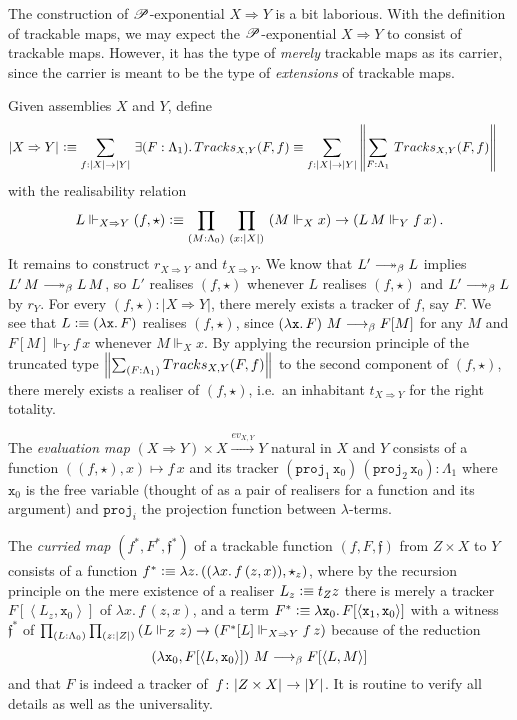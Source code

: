 \documentclass[a4paper,UKenglish,numberwithinsect,cleveref,thm-restate,draft]{lipics-v2021}
\numberwithin{equation}{section}
\theoremstyle{definition}
\theoremstyle{plain}
\begin{document}
The construction of $\PP$-exponential $X \Rightarrow Y$ is a bit laborious.
With the definition of trackable maps, we may expect the $\PP$-exponential $X \Rightarrow Y$ to consist of trackable maps.
However, it has the type of \emph{merely} trackable maps as its carrier, since the carrier is meant to be the type of \emph{extensions} of trackable maps.
\begin{example}[$\PP$-Exponential]
  Given assemblies $X$ and $Y$, define
  \begin{align*}
    \bproj{X \Rightarrow Y} & \defeq \sm{f : |X| \to |Y|} \exis{F : \Lambda_1} \mathsf{Tracks}_{X, Y}(F, f) \equiv \sm{f : |X| \to |Y|} \brck{\sm{F : \Lambda_1} \mathsf{Tracks}_{X, Y}(F, f) }
  \end{align*}
  with the realisability relation 
  \[
    L \Vdash_{X \Rightarrow Y} (f, \star) \defeq \prd{M : \Lambda_0}{x : |X|} \left( M \Vdash_X x\right) \to \left(L\,M \Vdash_Y f\,x\right).
  \]
  It remains to construct $r_{X\Rightarrow Y}$ and $t_{X \Rightarrow Y}$. 
  We know that $L' \reduce L$ implies $L'\,M \reduce L\,M$, so $L'$ realises $(f, \star)$ whenever $L$ realises $(f, \star)$ and $L' \reduce L$ by $r_Y$.
  For every $(f, \star) : |X \Rightarrow Y|$, there merely exists a tracker of $f$, say $F$.
  We see that $L \vcentcolon\equiv \left(\mathtt{\lambda x}.\,F\right)$ realises $(f, \star)$, since
  $\left(\mathtt{\lambda x}.\,F\right)\,M \longrightarrow_{\beta} F[M]$ for any $M$ and $F[M] \Vdash_Y f\,x$ whenever $M \Vdash_X x$.
  By applying the recursion principle of the truncated type $\brck{\sm{F : \Lambda_1} \mathsf{Tracks}_{X, Y}(F, f) }$ to the second component of $(f, \star)$, there merely exists a realiser of $(f, \star)$, i.e.\ an inhabitant $t_{X \Rightarrow Y}$ for the right totality.

  The \emph{evaluation map} $(X \Rightarrow Y) \times X \xrightarrow{ev_{X, Y}} Y$ natural in $X$ and $Y$ consists of a function
  $((f, \star) , x) \mapsto f\,x$ and its tracker $(\mathtt{proj}_1\, \mathtt{x}_0)\,(\mathtt{proj}_2\, \mathtt{x}_0) : \Lambda_1$ where $\mathtt{x}_0$ is the free variable (thought of as a pair of realisers for a function and its argument) and $\mathtt{proj}_i$ the projection function between $\lambda$-terms.

  The \emph{curried map} $(f^*, F^*, \mathfrak{f}^*)$ of a trackable function $(f, F, \mathfrak{f})$ from $Z \times X$ to $Y$ consists of
    a function
      $f^* \vcentcolon\equiv \lambda z.\, ((\lambda x.\, f\,(z, x)) , \star_z)$, 
      where by the recursion principle on the mere existence of a realiser $L_z \vcentcolon\equiv t_Z z$ there is merely a tracker~$F[\left< L_z , \mathtt{x}_0 \right>]$ of $\lambda x.\, f\,(z, x)$, and
    a term $F^* \vcentcolon\equiv \lambda \mathtt{x}_0.\, F[ \left< \mathtt{x}_1, \mathtt{x}_0 \right> ]$ with 
    a witness $\mathfrak{f}^*$ of $\prd{L : \Lambda_0}{z : |Z|} \left(L \Vdash_Z z\right) \to \left(F^*[L] \Vdash_{X \Rightarrow Y} f\, z\right)$ because of the reduction
      \[
        \left(\lambda \mathtt{x}_0, F[\left< L , \mathtt{x}_0 \right>]\right)\,M \longrightarrow_{\beta} F[\left< L , M \right>]
      \]
      and that $F$ is indeed a tracker of~$f\colon \mathopen{}\left|Z \times X\right|_{}^{}\mathclose{} \to \mathopen{}\left|Y\right|_{}^{}\mathclose{}$. 
  It is routine to verify all details as well as the universality.
\end{example}
\end{document}
